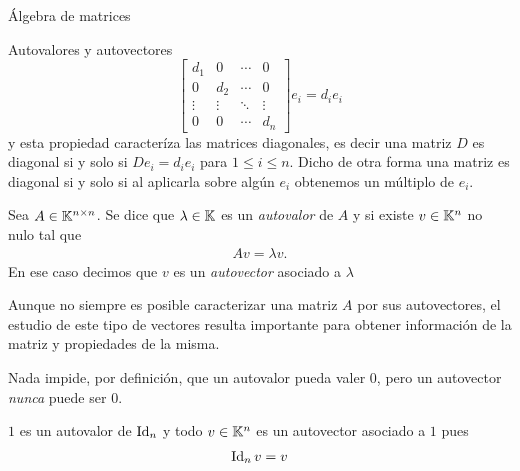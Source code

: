 \begin{chapter}{\'Algebra de matrices}
\begin{section}{Autovalores y autovectores}
\begin{equation*}
        \begin{bmatrix}
            d_1 & 0 & \cdots &0 \\
            0 & d_2 & \cdots &0 \\
            \vdots & \vdots & \ddots &\vdots \\
            0 & 0 & \cdots & d_n 
            \end{bmatrix}
        e_i
        = d_ie_i
    \end{equation*} 
    y esta propiedad caracteríza las matrices diagonales, es decir una matriz $D$ es diagonal si  y solo si $De_i =d_ie_i$ para $1 \le i \le n$. Dicho de  otra forma una matriz es diagonal si y solo si  al aplicarla sobre algún $e_i$ obtenemos un múltiplo de $e_i$. 

    \begin{definicion}
        Sea $A\in\mathbb K^{n\times n}$. Se dice que {$\lambda\in\mathbb K$} es un \textit{autovalor} de $A$ y si existe \textit{$v\in\mathbb K^{n}$} no nulo tal que 
        \begin{align*}
        Av=\lambda v .
        \end{align*}
        En ese caso decimos que $v$  es un \textit{autovector} asociado a $\lambda$
        \end{definicion}

        Aunque no siempre es posible caracterizar una matriz $A$  por sus autovectores, el estudio de este tipo de vectores  resulta importante para obtener información de la matriz y propiedades de la misma.  

        \begin{observacion*} Nada impide, por definición, que un autovalor pueda valer $0$, pero un autovector \textit{nunca} puede ser $0$. 
        \end{observacion*}

        \begin{ejemplo*}
        $1$ es un autovalor de $\operatorname{Id}_n$ y todo $v\in\mathbb K^n$ es un autovector asociado a $1$ pues
        \begin{align*}
        \operatorname{Id}_n v= v 
        \end{align*}
        \end{ejemplo*}
        

\end{section}
\end{chapter}
